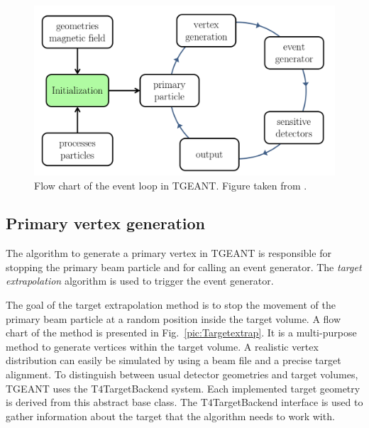 \begin{figure}[!h]
  \centering
	\includegraphics[scale=0.5]{./gfx/EventLoop.png}
	\caption{Flow chart of the event loop in TGEANT. Figure taken from \cite{Tobias}.}
	\label{pic:EventLoop}
\end{figure}

\subsection{Primary vertex generation}

The algorithm to generate a primary vertex in TGEANT is responsible for stopping the primary beam particle and for calling an event generator. The \textit{target extrapolation} algorithm is used to trigger the event generator.

The goal of the target extrapolation method is to stop the movement of the primary beam particle at a random position inside the target volume. A flow chart of the method is presented in Fig.~\ref{pic:Targetextrap}. It is a multi-purpose method to generate vertices within the target volume. A realistic vertex distribution can easily be simulated by using a beam file and a precise target alignment.
To distinguish between usual detector geometries and target volumes, TGEANT uses the T$4$TargetBackend system. Each implemented target geometry is derived from this abstract base class. The T$4$TargetBackend interface is used to gather information about the target that the algorithm needs to work with.

